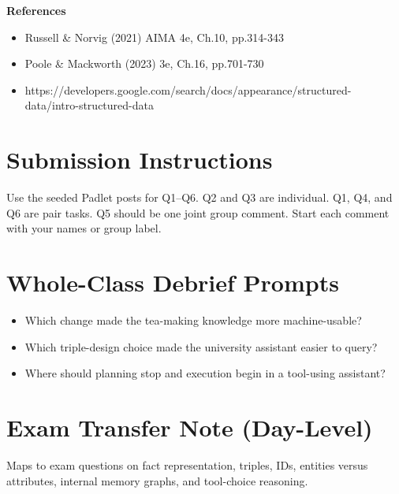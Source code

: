 \documentclass[11pt]{article}
\providecommand{\tightlist}{\setlength{\itemsep}{0pt}\setlength{\parskip}{0pt}}
\begin{document}
\begin{tcolorbox}[colback=white,colframe=MidnightBlue,title={Q6 Exam-Style Constructed Response},fonttitle=\bfseries,breakable]
{\large\bfseries\color{MidnightBlue} References}\par\medskip
\begin{itemize}\item Russell \& Norvig (2021) AIMA 4e, Ch.10, pp.314-343
\item Poole \& Mackworth (2023) 3e, Ch.16, pp.701-730
\item https://developers.google.com/search/docs/appearance/structured-data/intro-structured-data\end{itemize}
\end{tcolorbox}

\section*{Submission Instructions}

Use the seeded Padlet posts for Q1--Q6. Q2 and Q3 are individual. Q1, Q4, and Q6 are pair tasks. Q5 should be one joint group comment. Start each comment with your names or group label.

\section*{Whole-Class Debrief Prompts}

\begin{itemize}
\tightlist
\item
  Which change made the tea-making knowledge more machine-usable?
\item
  Which triple-design choice made the university assistant easier to query?
\item
  Where should planning stop and execution begin in a tool-using assistant?
\end{itemize}

\section*{Exam Transfer Note (Day-Level)}

Maps to exam questions on fact representation, triples, IDs, entities versus attributes, internal memory graphs, and tool-choice reasoning.
\end{document}
